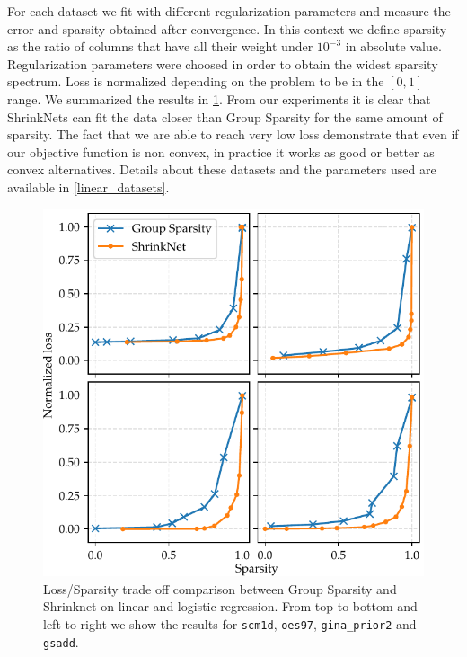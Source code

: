 For each dataset we fit with different regularization parameters and measure
the error and sparsity obtained after convergence. In this context we define
sparsity as the ratio of columns that have all their weight under $10^{-3}$ in
absolute value. Regularization parameters were choosed in order to obtain the
widest sparsity spectrum. Loss is normalized depending on the problem to be in
the $[0, 1]$ range. We summarized the results in \cref{sparsity_accuracy}. From
our experiments it is clear that ShrinkNets can fit the data closer than Group
Sparsity for the same amount of sparsity. The fact that we are able to reach
very low loss demonstrate that even if our objective function is non convex, in
practice it works as good or better as convex alternatives. Details about these
datasets and the parameters used are available in \cref{linear_datasets}.

\begin{figure}
\begin{center}
\includegraphics[width=\columnwidth]{regressions}
\vspace*{-5mm}
\caption{\label{sparsity_accuracy}Loss/Sparsity trade off comparison between Group Sparsity and Shrinknet on linear and logistic regression. From top to bottom and left to right we show the results for \texttt{scm1d}, \texttt{oes97}, \texttt{gina\_prior2} and \texttt{gsadd}.}

\end{center}
\vspace*{-4mm}
\end{figure}

